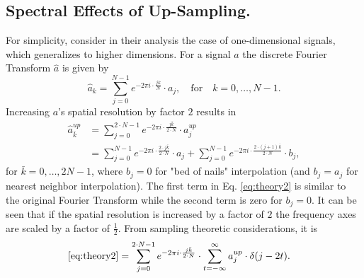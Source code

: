 \documentclass[letterpaper]{article} %
\begin{document}
\subsection{Spectral Effects of Up-Sampling.}
For simplicity,  \cite{margret2020upconvolution} consider in their analysis the case of one-dimensional signals, which generalizes to higher dimensions. For a signal $a$ the discrete Fourier Transform $\hat{a}$ is given by
\begin{equation}
\hat{a}_k=\sum_{j=0}^{N-1}e^{-2\pi i\cdot\frac{jk}{N}}\cdot a_j, \quad \mathrm{for }\quad k=0,\dots,N-1.
\end{equation}
Increasing $a$'s spatial resolution by factor $2$ results in %
\begin{align}
\hat{a}^{up}_{\bar{k}}&=\sum_{j=0}^{2\cdot N-1}e^{-2\pi i\cdot\frac{j\bar{k}}{2\cdot N}}\cdot a^{up}_j
\nonumber\\
&=\sum_{j=0}^{N-1}e^{-2\pi i\cdot\frac{2\cdot j\bar{k}}{2\cdot N}}\cdot a_j
+ \sum_{j=0}^{N-1}e^{-2\pi i\cdot\frac{2\cdot (j+1)\bar{k}}{2\cdot N}}\cdot b_j,
\label{eq:theory2}
\end{align}
for $\bar{k}=0,\dots,2N-1$, where $b_j=0$ for "bed of nails" interpolation (and $b_j=a_j$ for nearest neighbor interpolation).
The first term in Eq. \eqref{eq:theory2} is similar to the original Fourier Transform while the second term is zero for $b_j=0$.  %
It can be seen that if the spatial resolution is increased by a factor of $2$ the frequency axes are scaled by a factor of $\frac{1}{2}$. From sampling theoretic considerations, it is \cite{margret2020upconvolution}
\begin{align}
\eqref{eq:theory2}%
&=\sum_{j=0}^{2\cdot N-1}e^{-2\pi i\cdot\frac{j\bar{k}}{2\cdot N}}\cdot \sum_{t=-\infty}^{\infty}a^{up}_j\cdot\delta(j-2t).\label{eq:theory3}
\end{align}

\end{document}
